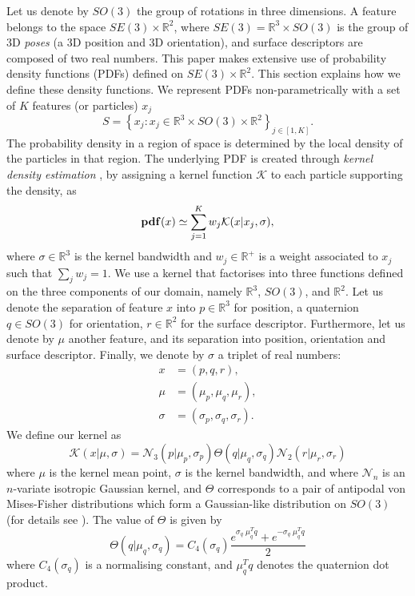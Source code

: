 Let us denote by $SO(3)$ the group of rotations in three dimensions. A feature belongs to the space $SE(3) \times \mathbb R^2$, where $SE(3) = \mathbb R^3 \times SO(3)$ is the group of 3D \emph{poses} (a 3D position and 3D orientation), and surface descriptors are composed of two real numbers. This paper makes extensive use of probability density functions (PDFs) defined on $SE(3) \times \mathbb R^2$. This section explains how we define these density functions. We represent PDFs non-parametrically with a set of $K$ features (or particles) $x_j$
\begin{equation}
S = \left\lbrace x_j : x_j \in \mathbb R^3 \times SO(3) \times \mathbb R^2 \right\rbrace_{j \in [1,K]}.
\end{equation}
The probability density in a region of space is determined by the local density of the particles in that region. The underlying PDF is created through \emph{kernel density estimation} \cite{silverman1986a}, by assigning a kernel function $\mathcal{K}$ to each particle supporting the density, as
\begin{equation}\label{eq:d}
\mathbf{pdf}(x) \simeq \sum_{j=1}^K w_j \mathcal{K}(x| x_{j}, \sigma),
\end{equation}
where  $\sigma \in \mathbb R^3$ is the kernel bandwidth and $w_j \in \mathbb R^{+}$ is a weight associated to $x_j$ such that $\sum_j w_j = 1$. We use a kernel that factorises into three functions defined on the three components of our domain, namely $\mathbb R^3$, $SO(3)$, and $\mathbb R^2$. Let us denote the separation of feature $x$ into $p \in \mathbb R^3$ for position, a quaternion $q \in SO(3)$ for orientation, $r \in \mathbb R^2$ for the surface descriptor. Furthermore, let us denote by $\mu$ another feature, and its separation into position, orientation and surface descriptor. Finally, we denote by $\sigma$ a triplet of real numbers:
\begin{subequations}
\begin{align}
x &= (p, q, r),\\
\mu &= (\mu_p, \mu_q, \mu_r),\\
\sigma &= (\sigma_p, \sigma_q, \sigma_r).
\end{align}
\label{eq:feature}
\end{subequations}
We define our kernel as
\begin{equation}\label{eq:kernel_in_se3}
\mathcal{K}(x| \mu, \sigma) = \mathcal{N}_3(p| \mu_p, \sigma_p) \Theta(q| \mu_q, \sigma_q) \mathcal{N}_2(r| \mu_r, \sigma_r)
\end{equation}
where $\mu$ is the kernel mean point, $\sigma$ is the kernel bandwidth, and where $\mathcal{N}_n$ is an $n$-variate isotropic Gaussian kernel, and ${\Theta}$ corresponds to a pair of antipodal von Mises-Fisher distributions which form a Gaussian-like distribution on $SO(3)$ (for details see \cite{fisher1953a,sudderth2006a}). The value of ${\Theta}$ is given by
\begin{equation}
\Theta(q|\mu_q, \sigma_q) = C_4(\sigma_q) \frac {e^{\sigma_q \; \mu_q^T q} + e^{-\sigma_q \; \mu_q^T q}}2
\end{equation}
where $C_4(\sigma_q)$ is a normalising constant, and $\mu_q^T q$ denotes the quaternion dot product.

